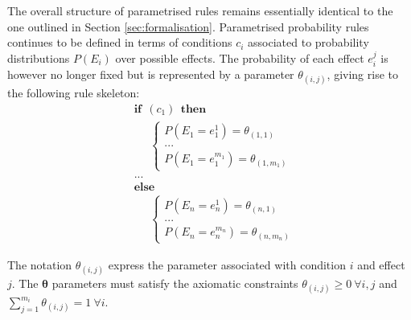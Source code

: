 The overall structure of parametrised rules remains essentially identical to the one outlined in Section \ref{sec:formalisation}.  Parametrised probability rules continues to be defined in terms of conditions $c_i$ associated to probability distributions $P(E_i)$ over possible effects.  The probability of each effect $e_i^j$ is however no longer fixed but is represented by a parameter $\theta_{(i,j)}$, giving rise to the following rule skeleton: 
\begin{equation}
\begin{aligned}
& \textbf{if} \ \ (c_{1}) \ \ \textbf{then} \\ 
& \;\;\;\;\; \begin{cases}
P(E_1\!=\!e_1^1) = \theta_{(1,1)} \\
 ... \\
P(E_1\!=\!e_1^{m_1}) = \theta_{(1,m_1)} 
\end{cases} \\[3mm]
& ...  \\
& \textbf{else} \\
& \;\;\;\;\; \begin{cases}
P(E_{n}\!=\!e_{n}^1) = \theta_{(n,1)} \\
... \\
P(E_{n}\!=\!e_{n}^{m_{n}}) = \theta_{(n,m_n)}
\end{cases}
\end{aligned}
\label{eq:probrule}
\end{equation}

The notation $\theta_{(i,j)}$ express the parameter associated with condition $i$ and effect $j$.  The $\boldsymbol\theta$ parameters must satisfy the axiomatic constraints $\theta_{(i,j)} \geq 0  \ \forall i,j$ and $\sum_{j = 1}^{m_i} \theta_{(i,j)} = 1 \ \forall i$.

